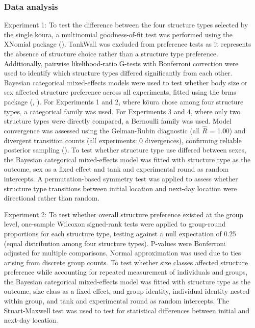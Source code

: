 \documentclass[
  letterpaper,
  DIV=11,
  numbers=noendperiod]{scrartcl}
\begin{document}
\subsubsection{Data analysis}\label{data-analysis}

Experiment 1: To test the difference between the four structure types
selected by the single kōura, a multinomial goodness-of-fit test was
performed using the XNomial package (). TankWall was excluded from preference tests as it represents the
absence of structure choice rather than a structure type preference.
Additionally, pairwise likelihood-ratio G-tests with Bonferroni
correction were used to identify which structure types differed
significantly from each other. Bayesian categorical mixed-effects models
were used to test whether body size or sex affected structure preference
across all experiments, fitted using the brms package
(,
). For Experiments 1 and 2, where kōura
chose among four structure types, a categorical family was used. For
Experiments 3 and 4, where only two structure types were directly
compared, a Bernoulli family was used. Model convergence was assessed
using the Gelman-Rubin diagnostic (all \(\hat{R}\) = 1.00) and divergent
transition counts (all experiments: 0 divergences), confirming reliable
posterior sampling ().
To test whether structure type use differed between sexes, the Bayesian
categorical mixed-effects model was fitted with structure type as the
outcome, sex as a fixed effect and tank and experimental round as random
intercepts. A permutation-based symmetry test was applied to assess
whether structure type transitions between initial location and next-day
location were directional rather than random.

Experiment 2: To test whether overall structure preference existed at
the group level, one-sample Wilcoxon signed-rank tests were applied to
group-round proportions for each structure type, testing against a null
expectation of 0.25 (equal distribution among four structure types).
P-values were Bonferroni adjusted for multiple comparisons. Normal
approximation was used due to ties arising from discrete group counts.
To test whether size classes affected structure preference while
accounting for repeated measurement of individuals and groups, the
Bayesian categorical mixed-effects model was fitted with structure type
as the outcome, size class as a fixed effect, and group identity,
individual identity nested within group, and tank and experimental round
as random intercepts. The Stuart-Maxwell test was used to test for
statistical differences between initial and next-day location.
\end{document}
